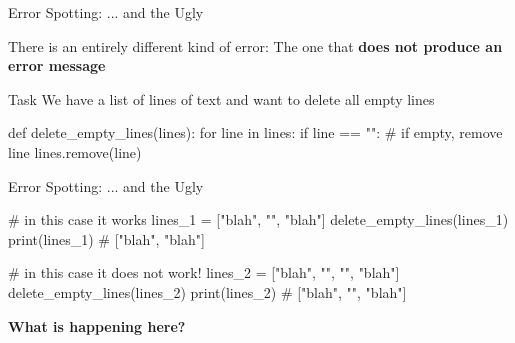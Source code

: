 \begin{frame}[fragile]{Error Spotting: ... and the Ugly}

    There is an entirely different kind of error: The one that \textbf{does not produce an error message}

    \vspace{1em}

    \begin{block}{Task}
        We have a list of lines of text and want to delete all empty lines
    \end{block}

    \begin{pythoncode}
    def delete_empty_lines(lines):
        for line in lines:
            if line == "":
                # if empty, remove line
                lines.remove(line)
    \end{pythoncode}


\end{frame}

\begin{frame}[fragile]{Error Spotting: ... and the Ugly}

    \begin{pythoncode}
    # in this case it works
    lines_1 = ["blah", "", "blah"]
    delete_empty_lines(lines_1)
    print(lines_1)  # ["blah", "blah"]

    # in this case it does not work!
    lines_2 = ["blah", "", "", "blah"]
    delete_empty_lines(lines_2)
    print(lines_2)  # ["blah", "", "blah"]
    \end{pythoncode}

    \vspace{1em}

    \textbf{What is happening here?}

\end{frame}

